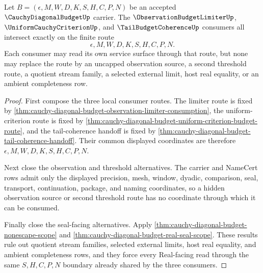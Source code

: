 \begin{theorem}
\label{thm:cauchy-diagonal-budget-consumer-triad-route-intersection}
Let $B=(\epsilon,M,W,D,K,S,H,C,P,N)$ be an accepted $\CauchyDiagonalBudgetUp$ carrier. The $\ObservationBudgetLimiterUp$, $\UniformCauchyCriterionUp$, and $\TailBudgetCoherenceUp$ consumers all intersect exactly on the finite route
$$
\epsilon,M,W,D,K,S,H,C,P,N.
$$
Each consumer may read its own service surface through that route, but none may replace the route by an uncapped observation source, a second threshold route, a quotient stream family, a selected external limit, host real equality, or an ambient completeness row.
\end{theorem}
\begin{proof}
First compose the three local consumer routes. The limiter route is fixed by \autoref{thm:cauchy-diagonal-budget-observation-limiter-consumption}, the uniform-criterion route is fixed by \autoref{thm:cauchy-diagonal-budget-uniform-criterion-budget-route}, and the tail-coherence handoff is fixed by \autoref{thm:cauchy-diagonal-budget-tail-coherence-handoff}. Their common displayed coordinates are therefore $\epsilon,M,W,D,K,S,H,C,P,N$.

Next close the observation and threshold alternatives. The carrier and NameCert rows admit only the displayed precision, mesh, window, dyadic, comparison, seal, transport, continuation, package, and naming coordinates, so a hidden observation source or second threshold route has no coordinate through which it can be consumed.

Finally close the seal-facing alternatives. Apply \autoref{thm:cauchy-diagonal-budget-nonescape-scope} and \autoref{thm:cauchy-diagonal-budget-real-seal-scope}. These results rule out quotient stream families, selected external limits, host real equality, and ambient completeness rows, and they force every Real-facing read through the same $S,H,C,P,N$ boundary already shared by the three consumers.
\end{proof}

